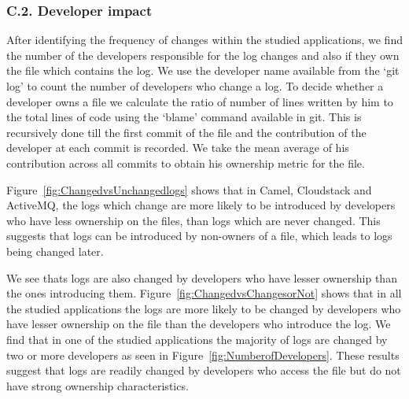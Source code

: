 \subsubsection*{C.2. Developer impact}
After identifying the frequency of changes within the studied applications, we find the number of the developers responsible for the log changes and also if they own the file which contains the log. We use the developer name available from the `git log' to count the number of developers who change a log. To decide whether a developer owns a file we calculate the ratio of number of lines written by him to the total lines of code using the `blame' command available in git. This is recursively done till the first commit of the file and the contribution of the developer at each commit is recorded.  We take the mean average of his contribution across all commits to obtain his ownership metric for the file. 



Figure~\ref{fig:ChangedvsUnchangedlogs} shows that in Camel, Cloudstack and ActiveMQ, the logs which change are more likely to be introduced by developers who have less ownership on the files, than logs which are never changed. This suggests that logs can be introduced by non-owners of a file, which leads to logs being changed later. 


We see thats logs are also changed by developers who have lesser ownership than the ones introducing them. Figure~\ref{fig:ChangedvsChangesorNot} shows that in all the studied applications the logs are more likely to be changed by developers who have lesser ownership on the file than the developers who introduce the log. We find that in one of the studied applications the majority of logs are changed by two or more developers as seen in Figure~\ref{fig:NumberofDevelopers}. These results suggest that logs are readily changed by developers who access the file but do not have strong ownership characteristics.   






